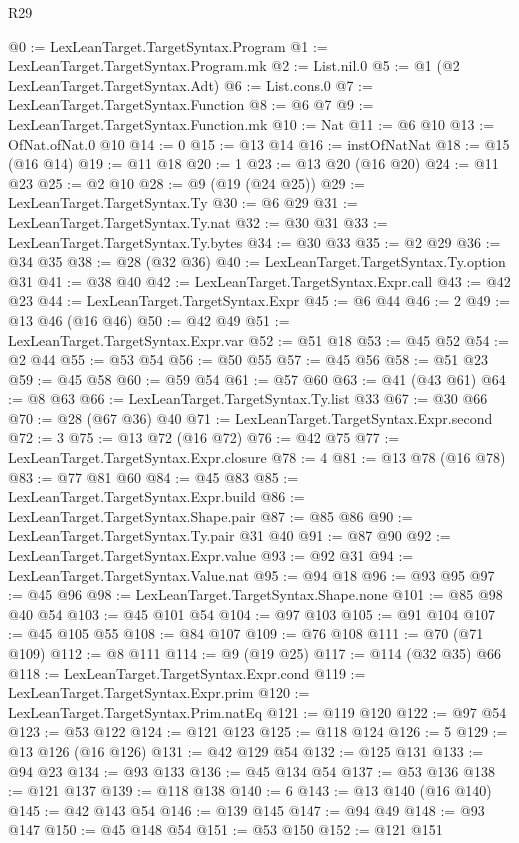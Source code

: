 \begin{lexlean}{R29}
\begin{coremodule}
@0 := LexLeanTarget.TargetSyntax.Program
@1 := LexLeanTarget.TargetSyntax.Program.mk
@2 := List.nil.{0}
@5 := @1 (@2 LexLeanTarget.TargetSyntax.Adt)
@6 := List.cons.{0}
@7 := LexLeanTarget.TargetSyntax.Function
@8 := @6 @7
@9 := LexLeanTarget.TargetSyntax.Function.mk
@10 := Nat
@11 := @6 @10
@13 := OfNat.ofNat.{0} @10
@14 := 0
@15 := @13 @14
@16 := instOfNatNat
@18 := @15 (@16 @14)
@19 := @11 @18
@20 := 1
@23 := @13 @20 (@16 @20)
@24 := @11 @23
@25 := @2 @10
@28 := @9 (@19 (@24 @25))
@29 := LexLeanTarget.TargetSyntax.Ty
@30 := @6 @29
@31 := LexLeanTarget.TargetSyntax.Ty.nat
@32 := @30 @31
@33 := LexLeanTarget.TargetSyntax.Ty.bytes
@34 := @30 @33
@35 := @2 @29
@36 := @34 @35
@38 := @28 (@32 @36)
@40 := LexLeanTarget.TargetSyntax.Ty.option @31
@41 := @38 @40
@42 := LexLeanTarget.TargetSyntax.Expr.call
@43 := @42 @23
@44 := LexLeanTarget.TargetSyntax.Expr
@45 := @6 @44
@46 := 2
@49 := @13 @46 (@16 @46)
@50 := @42 @49
@51 := LexLeanTarget.TargetSyntax.Expr.var
@52 := @51 @18
@53 := @45 @52
@54 := @2 @44
@55 := @53 @54
@56 := @50 @55
@57 := @45 @56
@58 := @51 @23
@59 := @45 @58
@60 := @59 @54
@61 := @57 @60
@63 := @41 (@43 @61)
@64 := @8 @63
@66 := LexLeanTarget.TargetSyntax.Ty.list @33
@67 := @30 @66
@70 := @28 (@67 @36) @40
@71 := LexLeanTarget.TargetSyntax.Expr.second
@72 := 3
@75 := @13 @72 (@16 @72)
@76 := @42 @75
@77 := LexLeanTarget.TargetSyntax.Expr.closure
@78 := 4
@81 := @13 @78 (@16 @78)
@83 := @77 @81 @60
@84 := @45 @83
@85 := LexLeanTarget.TargetSyntax.Expr.build
@86 := LexLeanTarget.TargetSyntax.Shape.pair
@87 := @85 @86
@90 := LexLeanTarget.TargetSyntax.Ty.pair @31 @40
@91 := @87 @90
@92 := LexLeanTarget.TargetSyntax.Expr.value
@93 := @92 @31
@94 := LexLeanTarget.TargetSyntax.Value.nat
@95 := @94 @18
@96 := @93 @95
@97 := @45 @96
@98 := LexLeanTarget.TargetSyntax.Shape.none
@101 := @85 @98 @40 @54
@103 := @45 @101 @54
@104 := @97 @103
@105 := @91 @104
@107 := @45 @105 @55
@108 := @84 @107
@109 := @76 @108
@111 := @70 (@71 @109)
@112 := @8 @111
@114 := @9 (@19 @25)
@117 := @114 (@32 @35) @66
@118 := LexLeanTarget.TargetSyntax.Expr.cond
@119 := LexLeanTarget.TargetSyntax.Expr.prim
@120 := LexLeanTarget.TargetSyntax.Prim.natEq
@121 := @119 @120
@122 := @97 @54
@123 := @53 @122
@124 := @121 @123
@125 := @118 @124
@126 := 5
@129 := @13 @126 (@16 @126)
@131 := @42 @129 @54
@132 := @125 @131
@133 := @94 @23
@134 := @93 @133
@136 := @45 @134 @54
@137 := @53 @136
@138 := @121 @137
@139 := @118 @138
@140 := 6
@143 := @13 @140 (@16 @140)
@145 := @42 @143 @54
@146 := @139 @145
@147 := @94 @49
@148 := @93 @147
@150 := @45 @148 @54
@151 := @53 @150
@152 := @121 @151

\end{coremodule}
\end{lexlean}
